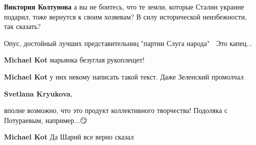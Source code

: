\begin{itemize}
\begin{itemize}
\textbf{Виктория Колтунова} а вы не боитесь, что те земли, которые Сталин украине подарил, тоже вернутся к своим хозяевам?
В силу исторической неизбежности, так сказать?

\end{itemize}

 

Опус, достойный лучших представительниц "партии Слуга народа" 🤦 Это капец...

\begin{itemize}

 
\textbf{Michael Kot} марьянка безуглая рукоплещет!


 
\textbf{Michael Kot} у них некому написать такой текст. Даже Зеленский промолчал

 
\textbf{Svetlana Kryukova},

вполне возможно, что это продукт коллективного творчества! Подоляка с
Потураевым, например...😏

 
\textbf{Michael Kot} Да Шарий все верно сказал

 

\end{itemize}
\end{itemize}
